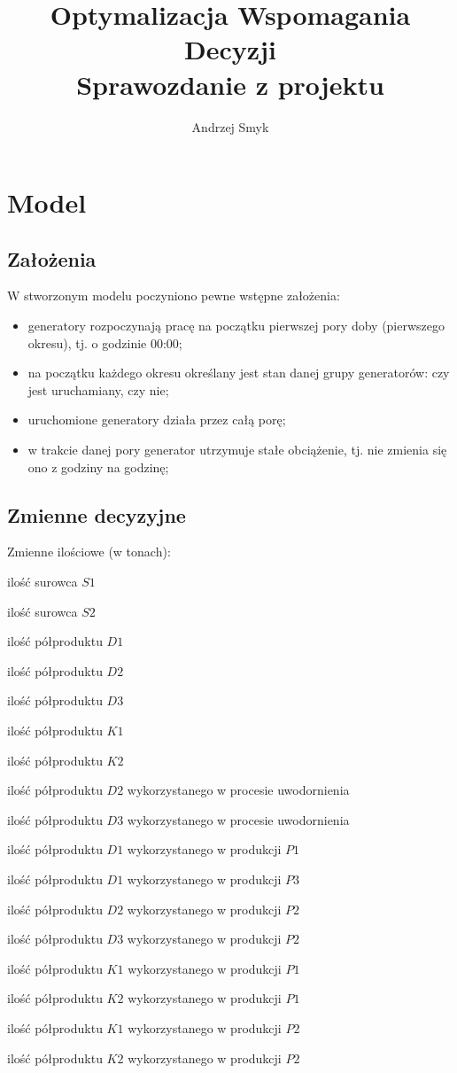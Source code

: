 \documentclass[a4paper,10pt,fleqn]{article}
\title{Optymalizacja Wspomagania Decyzji\\Sprawozdanie z projektu}
\author{Andrzej Smyk}
\begin{document}
	\maketitle
	\section{Model}
		\subsection{Założenia}
		W stworzonym modelu poczyniono pewne wstępne założenia:
		\begin{itemize}
			\item generatory rozpoczynają pracę na początku pierwszej pory doby (pierwszego okresu), tj. o godzinie 00:00;
			\item na początku każdego okresu określany jest stan danej grupy generatorów: czy jest uruchamiany, czy nie;
			\item uruchomione generatory działa przez całą porę;
			\item w trakcie danej pory generator utrzymuje stałe obciążenie, tj. nie zmienia się ono z godziny na godzinę;
		\end{itemize}

		\subsection{Zmienne decyzyjne}
		Zmienne ilościowe (w tonach):
		\begin{description}[align=left,labelwidth=1.5cm]
			\item[$S1$] ilość surowca $S1$
			\item[$S2$] ilość surowca $S2$
			\item[$D1$] ilość półproduktu $D1$
			\item[$D2$] ilość półproduktu $D2$
			\item[$D3$] ilość półproduktu $D3$
			\item[$K1$] ilość półproduktu $K1$
			\item[$K2$] ilość półproduktu $K2$
			\item[$D2K$] ilość półproduktu $D2$ wykorzystanego w procesie uwodornienia
			\item[$D3K$] ilość półproduktu $D3$ wykorzystanego w procesie uwodornienia
			\item[$D1P1$] ilość półproduktu $D1$ wykorzystanego w produkcji $P1$
			\item[$D1P3$] ilość półproduktu $D1$ wykorzystanego w produkcji $P3$
			\item[$D2P2$] ilość półproduktu $D2$ wykorzystanego w produkcji $P2$
			\item[$D3P2$] ilość półproduktu $D3$ wykorzystanego w produkcji $P2$
			\item[$K1P1$] ilość półproduktu $K1$ wykorzystanego w produkcji $P1$
			\item[$K2P1$] ilość półproduktu $K2$ wykorzystanego w produkcji $P1$
			\item[$K1P2$] ilość półproduktu $K1$ wykorzystanego w produkcji $P2$
			\item[$K2P2$] ilość półproduktu $K2$ wykorzystanego w produkcji $P2$
		\end{description}
\end{document}
